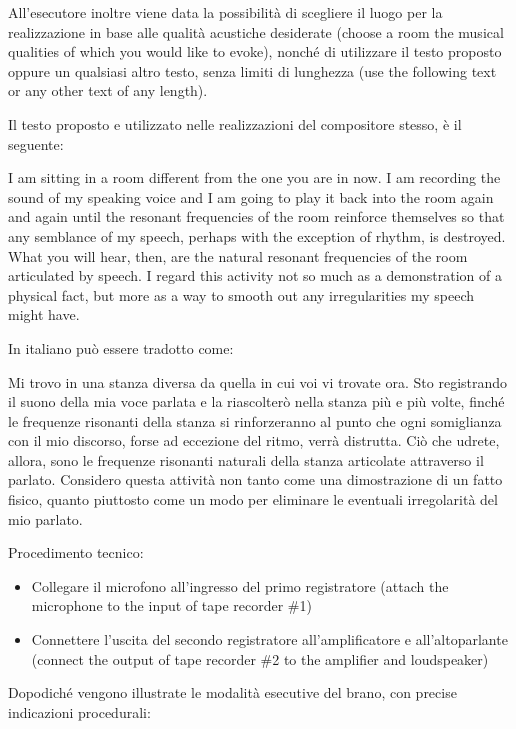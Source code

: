 All'esecutore inoltre viene data la possibilità di scegliere il luogo per la realizzazione in base alle qualità acustiche desiderate (choose a room the musical qualities of which you would like to evoke), nonché di utilizzare il testo proposto oppure un qualsiasi altro testo, senza limiti di lunghezza (use the following text or any other text of any length).

Il testo proposto e utilizzato nelle realizzazioni del compositore stesso, è il seguente:

I am sitting in a room different from the one you are in now. I am recording the sound of my speaking voice and I am going to play it back into the room again and again until the resonant frequencies of the room reinforce themselves so that any semblance of my speech, perhaps with the exception of rhythm, is destroyed. What you will hear, then, are the natural resonant frequencies of the room articulated by speech. I regard this activity not so much as a demonstration of a physical fact, but more as a way to smooth out any irregularities my speech might have.

In italiano può essere tradotto come:

Mi trovo in una stanza diversa da quella in cui voi vi trovate ora. Sto registrando il suono della mia voce parlata e la riascolterò nella stanza più e più volte, finché le frequenze risonanti della stanza si rinforzeranno al punto che ogni somiglianza con il mio discorso, forse ad eccezione del ritmo, verrà distrutta. Ciò che udrete, allora, sono le frequenze risonanti naturali della stanza articolate attraverso il parlato. Considero questa attività non tanto come una dimostrazione di un fatto fisico, quanto piuttosto come un modo per eliminare le eventuali irregolarità del mio parlato.

Procedimento tecnico:

\begin{itemize}
    \item Collegare il microfono all'ingresso del primo registratore (attach the microphone to the input of tape recorder \#1)
\end{itemize}

\begin{itemize}
    \item Connettere l'uscita del secondo registratore all'amplificatore e all'altoparlante (connect the output of tape recorder \#2 to the amplifier and loudspeaker)
\end{itemize}

Dopodiché vengono illustrate le modalità esecutive del brano, con precise indicazioni procedurali:

